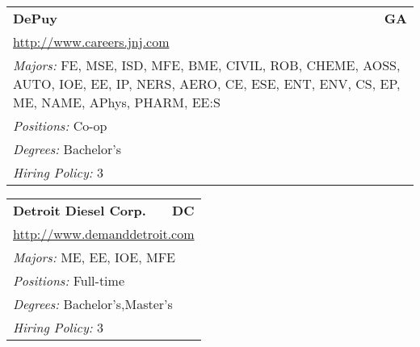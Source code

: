 \documentclass[twoside]{article}
\begin{document}
\begin{center}
\begin{multicols}{3}
\begin{FlushLeft}
\begin{minipage}{\columnwidth}
\end{minipage}
 
\begin{minipage}{\columnwidth}\begin{tabularx}{.95\columnwidth}{Xr}
                 {\Large\bf DePuy} & {\Large\bf GA}\\
    \multicolumn{2}{p{.95\columnwidth}}{\url{http://www.careers.jnj.com}}\\
    \multicolumn{2}{p{.95\columnwidth}}{\emph{Majors:} FE, MSE, ISD, MFE, BME, CIVIL, ROB, CHEME, AOSS, AUTO, IOE, EE, IP, NERS, AERO, CE, ESE, ENT, ENV, CS, EP, ME, NAME, APhys, PHARM, EE:S}\\
    \multicolumn{2}{p{.95\columnwidth}}{\emph{Positions:} Co-op}\\
    \multicolumn{2}{p{.95\columnwidth}}{\emph{Degrees:} Bachelor's}\\
    \multicolumn{2}{p{.95\columnwidth}}{\emph{Hiring Policy:} 3}\\
    \end{tabularx}
    
\end{minipage}
 
\begin{minipage}{\columnwidth}\begin{tabularx}{.95\columnwidth}{Xr}
                 {\Large\bf Detroit Diesel Corp.} & {\Large\bf DC}\\
    \multicolumn{2}{p{.95\columnwidth}}{\url{http://www.demanddetroit.com}}\\
    \multicolumn{2}{p{.95\columnwidth}}{\emph{Majors:} ME, EE, IOE, MFE}\\
    \multicolumn{2}{p{.95\columnwidth}}{\emph{Positions:} Full-time}\\
    \multicolumn{2}{p{.95\columnwidth}}{\emph{Degrees:} Bachelor's,Master's}\\
    \multicolumn{2}{p{.95\columnwidth}}{\emph{Hiring Policy:} 3}\\
    \end{tabularx}
    
\end{minipage}
 

\end{FlushLeft}
\end{multicols}
\end{center}
\end{document}
